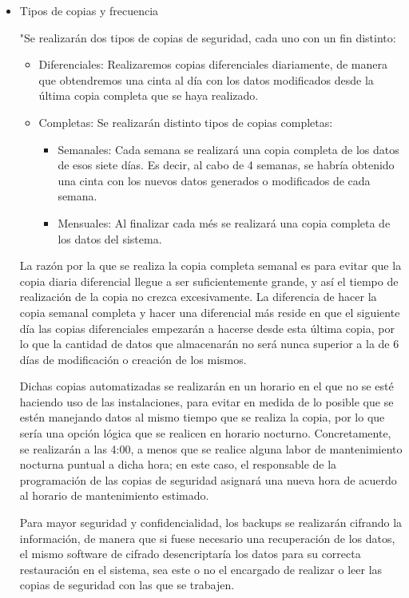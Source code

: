 \documentclass[a4paper,11pt,bibtotoc,noliststotoc]{scrbook}
\begin{document}
\begin{itemize}
\begin{itemize}
\item Tipos de copias y frecuencia

"Se realizarán dos tipos de copias de seguridad, cada uno con un fin distinto: 

\begin{itemize}
\item Diferenciales: Realizaremos copias diferenciales diariamente, de manera que obtendremos una cinta al día con los datos modificados desde la última copia completa que se haya realizado. 

\item Completas: Se realizarán distinto tipos de copias completas:

	\begin{itemize}
	\item Semanales: Cada semana se realizará una copia completa de los datos de esos siete días. Es decir, al cabo de 4 semanas, se habría obtenido una cinta con los nuevos datos generados o modificados de cada semana.
	\item Mensuales: Al finalizar cada més se realizará una copia completa de los datos del sistema.
	\end{itemize}

\end{itemize}

La razón por la que se realiza la copia completa semanal es para evitar que la copia diaria diferencial llegue a ser suficientemente grande, y así el tiempo de realización de la copia no crezca excesivamente. La diferencia de hacer la copia semanal completa y hacer una diferencial más reside en que el siguiente día las copias diferenciales empezarán a hacerse desde esta última copia, por lo que la cantidad de datos que almacenarán no será nunca superior a la de 6 días de modificación o creación de los mismos.

Dichas copias automatizadas se realizarán en un horario en el que no se esté haciendo uso de las instalaciones, para evitar en medida de lo posible que se estén manejando datos al mismo tiempo que se realiza la copia, por lo que sería una opción lógica que se realicen en horario nocturno. Concretamente, se realizarán a las 4:00, a menos que se realice alguna labor de mantenimiento nocturna puntual a dicha hora; en este caso, el responsable de la programación de las copias de seguridad asignará una nueva hora de acuerdo al horario de mantenimiento estimado.

Para mayor seguridad y confidencialidad, los backups se realizarán cifrando la información, de manera que si fuese necesario una recuperación de los datos, el mismo software de cifrado desencriptaría los datos para su correcta restauración en el sistema, sea este o no el encargado de realizar o leer las copias de seguridad con las que se trabajen.


\end{itemize}
\end{itemize}
\end{document}
